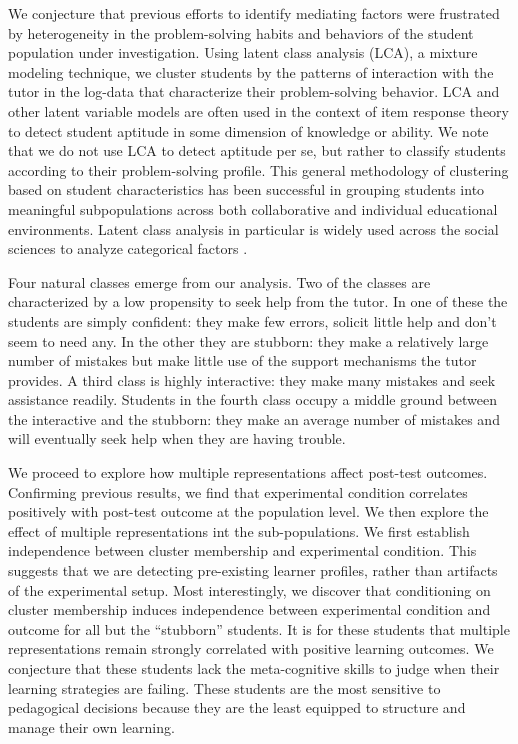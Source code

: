\documentclass{edm_template}
\begin{document}
We conjecture that previous efforts to identify mediating factors were frustrated by heterogeneity in the problem-solving habits and behaviors of the student population under investigation. Using latent class analysis (LCA), a mixture modeling technique, we cluster students by the patterns of interaction with the tutor in the log-data that characterize their problem-solving behavior. LCA and other latent variable models  are often used in the context of item response theory \cite{Linden1997, Wu2011} to detect student aptitude in some dimension of knowledge or ability. We note that we do not use LCA to detect aptitude per se, but rather to classify students according to their problem-solving profile. This general methodology of clustering based on student characteristics has been successful in grouping students into meaningful subpopulations across both collaborative \cite{Perera2009} and individual \cite{Merceron2005} educational environments. Latent class analysis in particular is widely used across the social sciences to analyze categorical factors \cite{Collins2009,Hagenaars2002}.

Four natural classes emerge from our analysis. Two of the classes are characterized by a low propensity to seek help from the tutor. In one of these the students are simply confident: they make few errors, solicit little help and don't seem to need any. In the other they are stubborn: they make a relatively large number of mistakes but make little use of the support mechanisms the tutor provides. A third class is highly interactive: they make many mistakes and seek assistance readily. Students in the fourth class occupy a middle ground between the interactive and the stubborn: they make an average number of mistakes and will eventually seek help when they are having trouble.

We proceed to explore how multiple representations affect post-test outcomes. Confirming previous results, we find that experimental condition correlates positively with post-test outcome at the population level. We then explore the effect of multiple representations int the sub-populations. We first establish independence between cluster membership and experimental condition. This suggests that we are detecting pre-existing learner profiles, rather than artifacts of the experimental setup. Most interestingly, we discover that conditioning on cluster membership induces independence between experimental condition and outcome for all but the ``stubborn'' students. It is for these students that multiple representations remain strongly correlated with positive learning outcomes. We conjecture that these students lack the meta-cognitive skills to judge when their learning strategies are failing. These students are the most sensitive to pedagogical decisions because they are the least equipped to structure and manage their own learning. 
\end{document}
